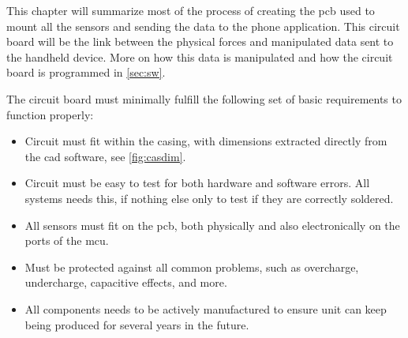 This chapter will summarize most of the process of creating the \gls{pcb} used to mount all the sensors and sending the data to the phone application. This circuit board will be the link between the physical forces and manipulated data sent to the handheld device. More on how this data is manipulated and how the circuit board is programmed in \autoref{sec:sw}. 

The circuit board must minimally fulfill the following set of basic requirements to function properly:
\begin{itemize}[noitemsep]
\item Circuit must fit within the casing, with dimensions extracted directly from the cad software\cite{cad}, see \autoref{fig:casdim}.
\item Circuit must be easy to test for both hardware and software errors. All systems needs this, if nothing else only to test if they are correctly soldered.
\item All sensors must fit on the \gls{pcb}, both physically and also electronically on the ports of the \gls{mcu}.
\item Must be protected against all common problems, such as overcharge, undercharge, capacitive effects, and more.
\item All components needs to be actively manufactured to ensure unit can keep being produced for several years in the future.
\end{itemize}

